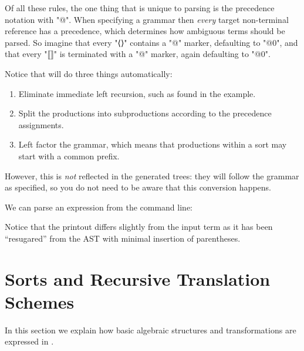 \documentclass[11pt]{article} %
\begin{document}
Of all these rules, the one thing that is unique to parsing is the precedence notation with "@".
When specifying a grammar then \emph{every} target non-terminal reference has a precedence, which
determines how ambiguous terms should be parsed. So imagine that every "⟨⟩" contains a "@" marker,
defaulting to "@0", and that every "⟦⟧" is terminated with a "@" marker, again defaulting to "@0".

Notice that \HAX will do three things automatically:
\begin{enumerate}
\item Eliminate immediate left recursion, such as found in the example.
\item Split the productions into subproductions according to the precedence assignments.
\item Left factor the grammar, which means that productions within a sort may start with a common
  prefix.
\end{enumerate}
However, this is \emph{not} reflected in the generated trees: they will follow the grammar as
specified, so you do not need to be aware that this conversion happens.

\begin{commands}
  We can parse an expression from the command line:
  Notice that the printout differs slightly from the input term as it has been ``resugared'' from
  the AST with minimal insertion of parentheses.
\end{commands}


\section{Sorts and Recursive Translation Schemes}
\label{sec:schemes}

In this section we explain how basic algebraic structures and transformations are expressed in \HAX.
\end{document}
